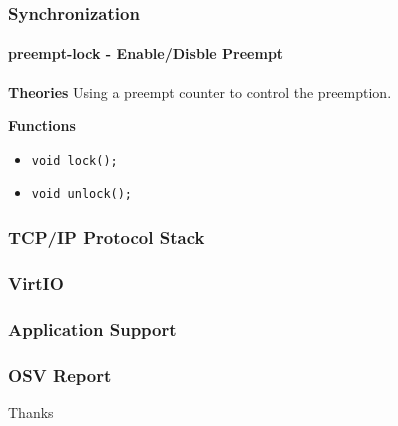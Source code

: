 \documentclass[10pt]{beamer}
\begin{document}
\begin{frame}
	\frametitle{Synchronization}
	\framesubtitle{preempt-lock - Enable/Disble Preempt}

	\textbf{Theories}
	Using a preempt counter to control the preemption.
	
	\smallskip

	\textbf{Functions}
	\begin{itemize}
		\item \texttt{void lock();}
		\item \texttt{void unlock();}
	\end{itemize}
	
\end{frame}


\begin{frame}
	\frametitle{TCP/IP Protocol Stack}

\end{frame}

\begin{frame}
	\frametitle{VirtIO}

\end{frame}


\begin{frame}
	\frametitle{Application Support}
	

\end{frame}



\begin{frame}
	\frametitle{OSV Report}

\center
Thanks

\end{frame}
\end{document}
